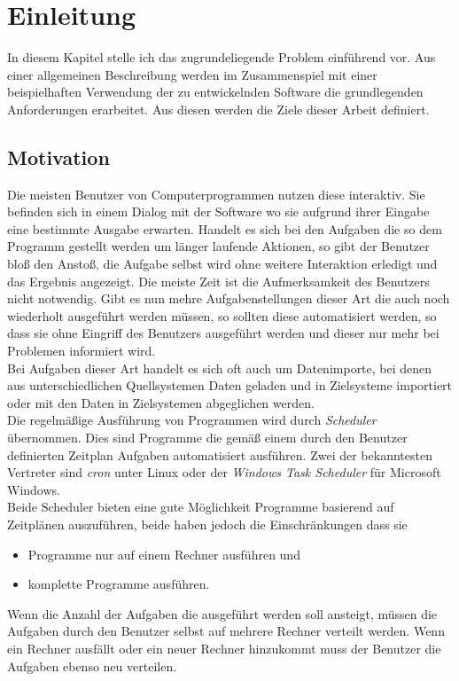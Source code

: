 \chapter{Einleitung}\label{chap:Einleitung}
\chapterstart
In diesem Kapitel stelle ich das zugrundeliegende Problem einführend vor. Aus einer allgemeinen Beschreibung werden im Zusammenspiel mit einer beispielhaften Verwendung der zu entwickelnden Software die grundlegenden Anforderungen erarbeitet. Aus diesen werden die Ziele dieser Arbeit definiert.
\section{Motivation}
Die meisten Benutzer von Computerprogrammen nutzen diese interaktiv. Sie befinden sich in einem Dialog mit der Software wo sie aufgrund ihrer Eingabe eine bestimmte Ausgabe erwarten. Handelt es sich bei den Aufgaben die so dem Programm gestellt werden um länger laufende Aktionen, so gibt der Benutzer bloß den Anstoß, die Aufgabe selbst wird ohne weitere Interaktion erledigt und das Ergebnis angezeigt. Die meiste Zeit ist die Aufmerksamkeit des Benutzers nicht notwendig. Gibt es nun mehre Aufgabenstellungen dieser Art die auch noch wiederholt ausgeführt werden müssen, so sollten diese automatisiert werden, so dass sie ohne Eingriff des Benutzers ausgeführt werden und dieser nur mehr bei Problemen informiert wird.\\
Bei Aufgaben dieser Art handelt es sich oft auch um Datenimporte, bei denen aus unterschiedlichen Quellsystemen Daten geladen und in Zielsysteme importiert oder mit den Daten in Zielsystemen abgeglichen werden.\\
Die regelmäßige Ausführung von Programmen wird durch \emph{Scheduler} übernommen. Dies sind Programme die gemäß einem durch den Benutzer definierten Zeitplan Aufgaben automatisiert ausführen. Zwei der bekanntesten Vertreter sind \emph{cron} unter Linux oder der \emph{Windows Task Scheduler} für Microsoft Windows.\\
Beide Scheduler bieten eine gute Möglichkeit Programme basierend auf Zeitplänen auszuführen, beide haben jedoch die Einschränkungen dass sie
\begin{itemize}
	\item Programme nur auf einem Rechner ausführen und
	\item komplette Programme ausführen.
\end{itemize}
Wenn die Anzahl der Aufgaben die ausgeführt werden soll ansteigt, müssen die Aufgaben durch den Benutzer selbst auf mehrere Rechner verteilt werden. Wenn ein Rechner ausfällt oder ein neuer Rechner hinzukommt muss der Benutzer die Aufgaben ebenso neu verteilen.\\
